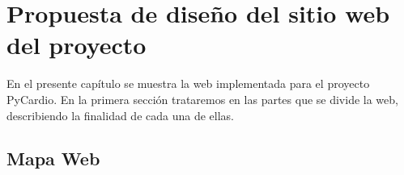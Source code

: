 \chapter{Propuesta de diseño del sitio web del proyecto}
\label{chap:webProp}
En el presente capítulo se muestra la web implementada para el proyecto PyCardio. En la primera sección trataremos en las partes que se divide la web, describiendo la finalidad de cada una de ellas.

\section{Mapa Web}
\label{sec:webMap}